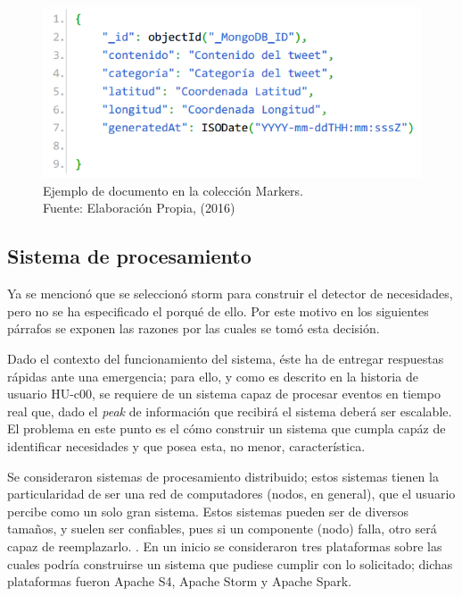 \begin{figure}[H]
	\centering
	\captionsetup{justification=centering}
	\includegraphics[scale=0.8]{images/Marker1.png}
	\caption[Ejemplo de documento en la colección Markers.]{Ejemplo de documento en la colección Markers.\\Fuente: Elaboración Propia, (2016)}
	\label{fig:esquemaMarker1}
\end{figure}

\subsection{Sistema de procesamiento}
\label{sec:diseno:sistDeProce}

Ya se mencionó que se seleccionó storm para construir el detector de necesidades, pero no se ha especificado el porqué de ello. Por este motivo en los siguientes párrafos se exponen las razones por las cuales se tomó esta decisión.

Dado el contexto del funcionamiento del sistema, éste ha de entregar respuestas rápidas ante una emergencia; para ello, y como es descrito en la historia de usuario HU-c00, se requiere de un sistema capaz de procesar eventos en tiempo real que, dado el \textit{peak} de información que recibirá el sistema deberá ser escalable. El problema en este punto es el cómo construir un sistema que cumpla capáz de identificar necesidades y que posea esta, no menor, característica.

Se consideraron sistemas de procesamiento distribuido; estos sistemas tienen la particularidad de ser una red de computadores (nodos, en general), que el usuario percibe como un solo gran sistema. Estos sistemas pueden ser de diversos tamaños, y suelen ser confiables, pues si un componente (nodo) falla, otro será capaz de reemplazarlo. \cite{DefSPD}. En un inicio se consideraron tres plataformas sobre las cuales podría construirse un sistema que pudiese cumplir con lo solicitado; dichas plataformas fueron Apache S4, Apache Storm y Apache Spark.

